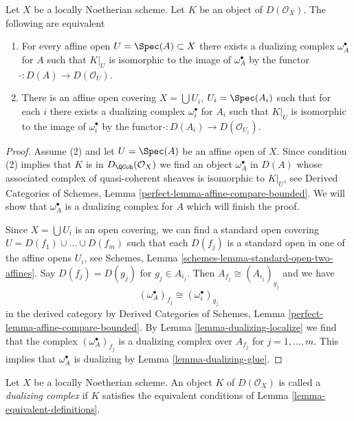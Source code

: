 \begin{lemma}
\label{lemma-equivalent-definitions}
Let $X$ be a locally Noetherian scheme. Let $K$ be an object of
$D(\mathcal{O}_X)$. The following are equivalent
\begin{enumerate}
\item For every affine open $U = \Spec(A) \subset X$ there exists
a dualizing complex $\omega_A^\bullet$ for $A$ such that
$K|_U$ is isomorphic to the image of $\omega_A^\bullet$ by
the functor $\widetilde{} : D(A) \to D(\mathcal{O}_U)$.
\item There is an affine open covering $X = \bigcup U_i$, $U_i = \Spec(A_i)$
such that for each $i$ there exists a dualizing complex $\omega_i^\bullet$
for $A_i$ such that $K|_U$ is isomorphic to the image of $\omega_i^\bullet$ by
the functor $\widetilde{} : D(A_i) \to D(\mathcal{O}_{U_i})$.
\end{enumerate}
\end{lemma}

\begin{proof}
Assume (2) and let $U = \Spec(A)$ be an affine open of $X$.
Since condition (2) implies that $K$ is in $D_\QCoh(\mathcal{O}_X)$
we find an object $\omega_A^\bullet$ in $D(A)$ whose associated
complex of quasi-coherent sheaves is isomorphic to $K|_U$, see
Derived Categories of Schemes, Lemma
\ref{perfect-lemma-affine-compare-bounded}.
We will show that $\omega_A^\bullet$ is a dualizing complex for $A$
which will finish the proof.

\medskip\noindent
Since $X = \bigcup U_i$ is an open covering, we can find a standard
open covering $U = D(f_1) \cup \ldots \cup D(f_m)$ such that
each $D(f_j)$ is a standard open in one of the affine opens $U_i$, see
Schemes, Lemma \ref{schemes-lemma-standard-open-two-affines}.
Say $D(f_j) = D(g_j)$ for $g_j \in A_{i_j}$.
Then $A_{f_j} \cong (A_{i_j})_{g_j}$ and we have
$$
(\omega_A^\bullet)_{f_j} \cong (\omega_i^\bullet)_{g_j}
$$
in the derived category by
Derived Categories of Schemes, Lemma
\ref{perfect-lemma-affine-compare-bounded}.
By Lemma \ref{lemma-dualizing-localize} we find that
the complex $(\omega_A^\bullet)_{f_j}$ is a dualizing complex over
$A_{f_j}$ for $j = 1, \ldots, m$. This implies that $\omega_A^\bullet$
is dualizing by Lemma \ref{lemma-dualizing-glue}.
\end{proof}

\begin{definition}
\label{definition-dualizing-scheme}
Let $X$ be a locally Noetherian scheme. An object $K$ of
$D(\mathcal{O}_X)$ is called a {\it dualizing complex} if
$K$ satisfies the equivalent conditions of
Lemma \ref{lemma-equivalent-definitions}.
\end{definition}

